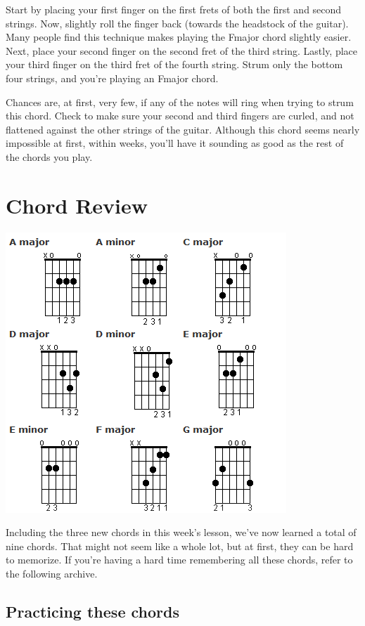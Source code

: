 Start by placing your first finger on the first frets of both the first and second strings. Now, slightly roll the finger back (towards the headstock of the guitar). Many people find this technique makes playing the Fmajor chord slightly easier. Next, place your second finger on the second fret of the third string. Lastly, place your third finger on the third fret of the fourth string. Strum only the bottom four strings, and you're playing an Fmajor chord.

Chances are, at first, very few, if any of the notes will ring when trying to strum this chord. Check to make sure your second and third fingers are curled, and not flattened against the other strings of the guitar. Although this chord seems nearly impossible at first, within weeks, you'll have it sounding as good as the rest of the chords you play.

\section{Chord Review}
\includegraphics{partthree/lesson-three-chord-chart.png}

Including the three new chords in this week's lesson, we've now learned a total of nine chords. That might not seem like a whole lot, but at first, they can be hard to memorize. If you're having a hard time remembering all these chords, refer to the following archive.

\subsection{Practicing these chords}

